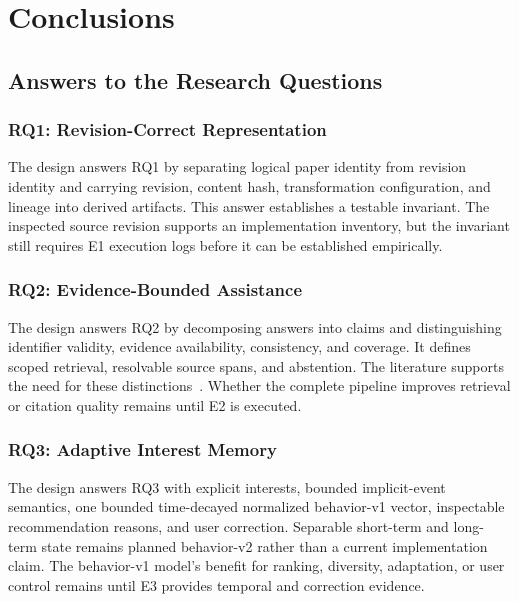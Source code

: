﻿%

\chapter{Conclusions}

\section{Answers to the Research Questions}

\subsection{RQ1: Revision-Correct Representation}

The design answers RQ1 by separating logical paper identity from revision identity and carrying revision, content hash, transformation configuration, and lineage into derived artifacts.
This answer establishes a testable invariant.
The inspected source revision supports an implementation inventory, but the invariant still requires E1 execution logs before it can be established empirically.

\subsection{RQ2: Evidence-Bounded Assistance}

The design answers RQ2 by decomposing answers into claims and distinguishing identifier validity, evidence availability, consistency, and coverage.
It defines scoped retrieval, resolvable source spans, and abstention.
The literature supports the need for these distinctions~\cite{gao2023alce,es2024ragas,huang2024grounded,niu2024ragtruth}.
Whether the complete pipeline improves retrieval or citation quality remains \pending{} until E2 is executed.

\subsection{RQ3: Adaptive Interest Memory}

The design answers RQ3 with explicit interests, bounded implicit-event semantics, one bounded time-decayed normalized behavior-v1 vector, inspectable recommendation reasons, and user correction.
Separable short-term and long-term state remains planned behavior-v2 rather than a current implementation claim.
The behavior-v1 model's benefit for ranking, diversity, adaptation, or user control remains \pending{} until E3 provides temporal and correction evidence.

